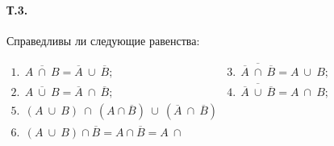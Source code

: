 \documentclass[a4paper,12pt]{article} %
\newcommand{\ol}[1]{\ensuremath{\overline{#1}}}
\begin{document}
\paragraph{Т.3.} Справедливы ли следующие равенства:

$\begin{array}{lc}
	1.~~\ol{A~\cap~B}=\ol{A}~\cup~\ol{B}; & 
	3.~~\ol{\ol{A}~\cap~\ol{B}}=A~\cup~B;\\
	2.~~\ol{A~\cup~B}=\ol{A}~\cap~\ol{B}; &
	4.~~\ol{\ol{A}~\cup~\ol{B}}=A~\cap~B;\\
	5.~~(A~\cup~B)~\cap~(A\cap\ol{B})~\cup~(\ol{A}~\cap~\ol{B}) &\\
	6.~~(A~\cup~B)\cap\ol{B}=A\cap\ol{B}=A~\cap~
\end{array}$
\end{document}
